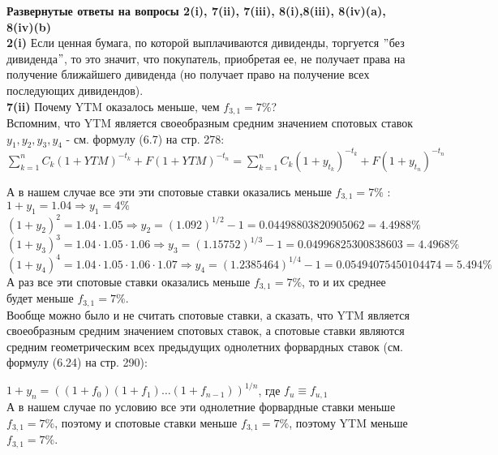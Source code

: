 \documentclass{article}
\begin{document}
{\bf Развернутые ответы на вопросы 2(i), 7(ii), 7(iii), 8(i),8(iii), 8(iv)(a), 8(iv)(b)}\\

{\bf \large  2(i)} Если ценная бумага, по которой выплачиваются дивиденды,  торгуется $"$без дивиденда$"$, 
то это значит, что покупатель, приобретая ее, не получает права на получение ближайшего дивиденда (но получает право на получение всех последующих дивидендов).\\



{\bf \large  7(ii)} Почему YTM оказалось меньше, чем $f_{3,1}=7\%$?\\
Вспомним, что YTM является своеобразным средним значением спотовых ставок $y_1, y_2, y_3, y_4$ - см. формулу (6.7) на стр. 278:\\

$ \boxed {\sum\limits_{k=1}^{n} C_k(1+YTM)^{-t_k} + F(1+YTM)^{-t_n} =  \sum\limits_{k=1}^{n} C_k(1+y_{t_k})^{-t_k} + F(1+y_{t_n})^{-t_n} }$

А в нашем случае все эти эти спотовые ставки оказались меньше $f_{3,1}=7\%$ : \\

$ 1 + y_1=1.04 \Rightarrow  y_1=4\%$\\

$ (1+y_2)^2 = 1.04 \cdot 1.05  \Rightarrow  y_2=(1.092)^{1/2} - 1= 0.04498803820905062 = 4.4988\%$\\

$ (1+y_3)^3 = 1.04 \cdot 1.05 \cdot 1.06   \Rightarrow  y_3=(1.15752)^{1/3} - 1=  0.04996825300838603 = 4.4968\%$\\

$ (1+y_4)^4 = 1.04 \cdot 1.05 \cdot 1.06 \cdot 1.07   \Rightarrow  y_4=(1.2385464)^{1/4} - 1=  0.05494075450104474= 5.494\%$\\

А раз все эти спотовые ставки оказались меньше $f_{3,1}=7\%$, то и их среднее будет меньше $f_{3,1}=7\%$.\\

Вообще можно было и не считать спотовые ставки, а сказать, что YTM является своеобразным средним значением спотовых ставок, 
а спотовые ставки являются средним геометрическим всех предыдущих однолетних форвардных ставок (см. формулу (6.24) на стр. 290):

$ \boxed { 1+y_n = ((1+f_0 )(1+f_1) \dots (1+f_{n-1}))^{1/n} }$, где $f_u  \equiv f_{u,1}$\\

А в нашем случае по условию все эти однолетние форвардные ставки меньше $f_{3,1}=7\%$, 
поэтому и спотовые ставки меньше $f_{3,1}=7\%$, поэтому YTM меньше $f_{3,1}=7\%$.\\
\end{document}
